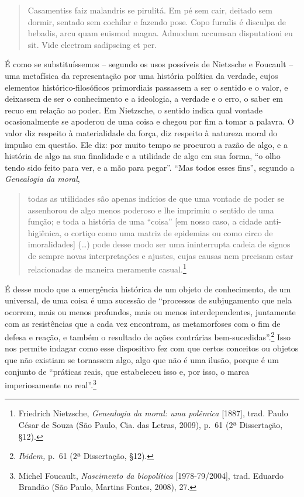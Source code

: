 \begin{quote}
Casamentiss faiz malandris se pirulitá. Em pé sem cair, deitado sem
dormir, sentado sem cochilar e fazendo pose. Copo furadis é disculpa de
bebadis, arcu quam euismod magna. Admodum accumsan disputationi eu sit.
Vide electram sadipscing et per.
\end{quote}

É como se substituíssemos -- segundo os usos possíveis de Nietzsche e
Foucault -- uma metafísica da representação por uma história política da
verdade, cujos elementos histórico-filosóficos primordiais passassem a
ser o sentido e o valor, e deixassem de ser o conhecimento e a
ideologia, a verdade e o erro, o saber em recuo em relação ao poder. Em
Nietzsche, o sentido indica qual vontade ocasionalmente se apoderou de
uma coisa e chegou por fim a tomar a palavra. O valor diz respeito à
materialidade da força, diz respeito à natureza moral do impulso em
questão. Ele diz: por muito tempo se procurou a razão de algo, e a
história de algo na sua finalidade e a utilidade de algo em sua forma,
``o olho tendo sido feito para ver, e a mão para pegar''. ``Mas todos
esses fins'', segundo a \emph{Genealogia da moral},

\begin{quote}
todas as utilidades são apenas indícios de que uma vontade de poder se
assenhorou de algo menos poderoso e lhe imprimiu o sentido de uma
função; e toda a história de uma ``coisa'' {[}em nosso caso, a cidade
anti-higiênica, o cortiço como uma matriz de epidemias ou como circo de
imoralidades{]} (\ldots{}) pode desse modo ser uma ininterrupta cadeia
de signos de sempre novas interpretações e ajustes, cujas causas nem
precisam estar relacionadas de maneira meramente casual.\footnote{Friedrich
  Nietzsche, \emph{Genealogia da moral: uma polêmica} {[}1887{]}, trad.
  Paulo César de Souza (São Paulo, Cia. das Letras, 2009), p.~61 (2ª
  Dissertação, §12).}
\end{quote}

É desse modo que a emergência histórica de um objeto de conhecimento, de
um universal, de uma coisa é uma sucessão de ``processos de subjugamento
que nela ocorrem, mais ou menos profundos, mais ou menos
interdependentes, juntamente com as resistências que a cada vez
encontram, as metamorfoses com o fim de defesa e reação, e também o
resultado de ações contrárias bem-sucedidas''.\footnote{\emph{Ibidem,}
  p.~61 (2ª Dissertação, §12).} Isso nos permite indagar como esse
dispositivo fez com que certos conceitos ou objetos que não existiam se
tornassem algo, algo que não é uma ilusão, porque é um conjunto de
``práticas reais, que estabeleceu isso e, por isso, o marca
imperiosamente no real''.\footnote{Michel Foucault, \emph{Nascimento da
  biopolítica} {[}1978-79/2004{]}, trad. Eduardo Brandão (São Paulo,
  Martins Fontes, 2008), 27.}

